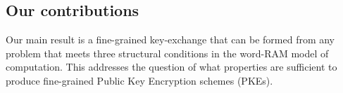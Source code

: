 %
%
%
%
%


\subsection{Our contributions}

Our main result is a fine-grained key-exchange that can be formed from any problem that meets three structural conditions in the word-RAM model of computation. This addresses the question of what properties are sufficient to produce fine-grained Public Key Encryption schemes (PKEs).


